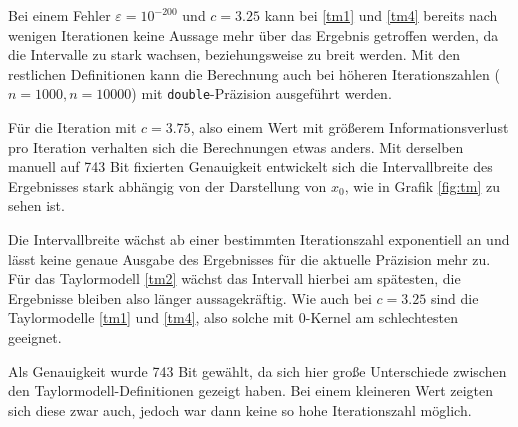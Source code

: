 Bei einem Fehler $\varepsilon = 10^{-200}$ und $c=3.25$ kann bei \ref{tm1} und \ref{tm4} bereits nach wenigen Iterationen keine Aussage mehr über das Ergebnis getroffen werden, da die Intervalle zu stark wachsen, beziehungsweise zu breit werden. Mit den restlichen Definitionen kann die Berechnung auch bei höheren Iterationszahlen ($n=1000, n=10000$) mit \verb+double+-Präzision ausgeführt werden.  
   

Für die Iteration mit $c=3.75$, also einem Wert mit größerem Informationsverlust pro Iteration verhalten sich die Berechnungen etwas anders. Mit derselben manuell auf 743 Bit fixierten Genauigkeit entwickelt sich die Intervallbreite des Ergebnisses stark abhängig von der Darstellung von $x_0$, wie in Grafik \ref{fig:tm} zu sehen ist.  
          


Die Intervallbreite wächst ab einer bestimmten Iterationszahl exponentiell an und lässt keine genaue Ausgabe des Ergebnisses für die aktuelle Präzision mehr zu. Für das Taylormodell \ref{tm2} wächst das Intervall hierbei am spätesten, die Ergebnisse bleiben also länger aussagekräftig. Wie auch bei $c=3.25$ sind die Taylormodelle \ref{tm1} und \ref{tm4}, also solche mit 0-Kernel am schlechtesten geeignet.


Als Genauigkeit wurde 743 Bit gewählt, da sich hier große Unterschiede zwischen den Taylormodell-Definitionen gezeigt haben. Bei einem kleineren Wert zeigten sich diese zwar auch, jedoch war dann keine so hohe Iterationszahl möglich.


